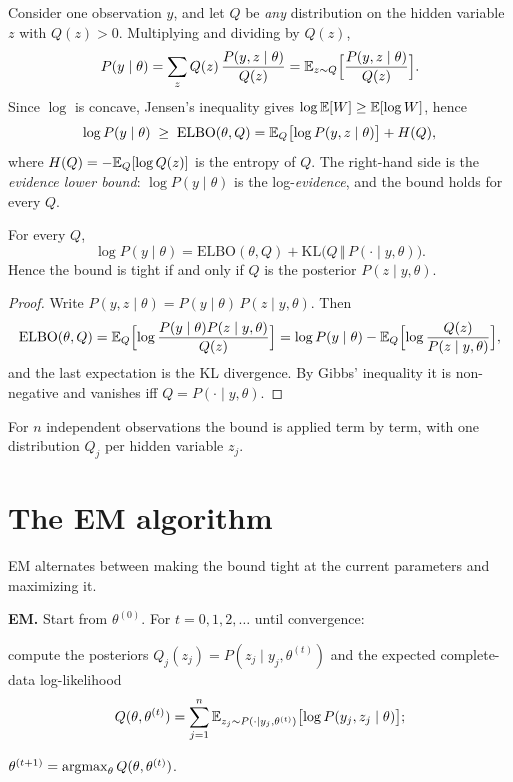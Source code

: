 \begin{notechapter}
Consider one observation $y$, and let $Q$ be \emph{any} distribution on the hidden
variable $z$ with $Q(z)>0$. Multiplying and dividing by $Q(z)$,
\[
  P(y\mid\theta) = \sum_zQ(z)\,\frac{P(y,z\mid\theta)}{Q(z)} = \mathbb{E}_{z\sim Q}\Bigl[\frac{P(y,z\mid\theta)}{Q(z)}\Bigr].
\]
Since $\log$ is concave, Jensen's inequality gives $\log\mathbb{E}[W]\geq\mathbb{E}[\log W]$, hence
\begin{equation}\label{em-algorithm:eq:elbo}
  \log P(y\mid\theta)\;\geq\;\mathrm{ELBO}(\theta, Q) = \mathbb{E}_Q\bigl[\log P(y,z\mid\theta)\bigr] + H(Q),
\end{equation}
where $H(Q) = -\mathbb{E}_Q[\log Q(z)]$ is the entropy of $Q$. The right-hand side is the
\emph{evidence lower bound}: $\log P(y\mid\theta)$ is the log-\emph{evidence}, and
the bound holds for every $Q$.

\begin{proposition}\label{em-algorithm:prop:gap}
For every $Q$,
\[
  \log P(y\mid\theta) = \mathrm{ELBO}(\theta,Q) + \mathrm{KL}\bigl(Q\,\Vert\,P(\cdot\mid y,\theta)\bigr).
\]
Hence the bound is tight if and only if $Q$ is the posterior $P(z\mid y,\theta)$.
\end{proposition}

\begin{proof}
Write $P(y,z\mid\theta) = P(y\mid\theta)\,P(z\mid y,\theta)$. Then
\[
  \mathrm{ELBO}(\theta,Q) = \mathbb{E}_Q\Bigl[\log\frac{P(y\mid\theta)P(z\mid y,\theta)}{Q(z)}\Bigr]
  = \log P(y\mid\theta) - \mathbb{E}_Q\Bigl[\log\frac{Q(z)}{P(z\mid y,\theta)}\Bigr],
\]
and the last expectation is the KL divergence. By Gibbs' inequality it is
non-negative and vanishes iff $Q = P(\cdot\mid y,\theta)$.
\end{proof}

For $n$ independent observations the bound is applied term by term, with one
distribution $Q_j$ per hidden variable $z_j$.

\section{The EM algorithm}\label{em-algorithm:sec:algorithm}

EM alternates between making the bound tight at the current parameters and
maximizing it.

\begin{center}
\begin{minipage}{0.92\linewidth}
\textbf{EM.} Start from $\theta^{(0)}$. For $t = 0, 1, 2,\dots$ until convergence:
\begin{description}[nosep]
  \item[E-step:] compute the posteriors $Q_j(z_j) = P(z_j\mid y_j,\theta^{(t)})$ and the
        expected complete-data log-likelihood
        \[
          Q(\theta,\theta^{(t)}) = \sum_{j=1}^n\mathbb{E}_{z_j\sim P(\cdot\mid y_j,\theta^{(t)})}\bigl[\log P(y_j,z_j\mid\theta)\bigr];
        \]
  \item[M-step:] $\theta^{(t+1)} = \operatorname*{argmax}_\theta Q(\theta,\theta^{(t)})$.
\end{description}
\end{minipage}
\end{center}


\end{notechapter}
